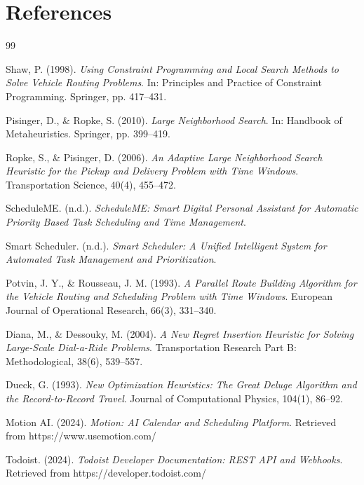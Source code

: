 \documentclass{article}
\begin{document}
\section*{References}

\begin{thebibliography}{99}

Shaw, P. (1998).
\textit{Using Constraint Programming and Local Search Methods to Solve Vehicle Routing Problems}.
In: Principles and Practice of Constraint Programming. Springer, pp. 417--431.

Pisinger, D., \& Ropke, S. (2010).
\textit{Large Neighborhood Search}.
In: Handbook of Metaheuristics. Springer, pp. 399--419.

Ropke, S., \& Pisinger, D. (2006).
\textit{An Adaptive Large Neighborhood Search Heuristic for the Pickup and Delivery Problem with Time Windows}.
Transportation Science, 40(4), 455--472.

ScheduleME. (n.d.).
\textit{ScheduleME: Smart Digital Personal Assistant for Automatic Priority Based Task Scheduling and Time Management}.

Smart Scheduler. (n.d.).
\textit{Smart Scheduler: A Unified Intelligent System for Automated Task Management and Prioritization}.

Potvin, J. Y., \& Rousseau, J. M. (1993).
\textit{A Parallel Route Building Algorithm for the Vehicle Routing and Scheduling Problem with Time Windows}.
European Journal of Operational Research, 66(3), 331--340.

Diana, M., \& Dessouky, M. (2004).
\textit{A New Regret Insertion Heuristic for Solving Large-Scale Dial-a-Ride Problems}.
Transportation Research Part B: Methodological, 38(6), 539--557.

Dueck, G. (1993).
\textit{New Optimization Heuristics: The Great Deluge Algorithm and the Record-to-Record Travel}.
Journal of Computational Physics, 104(1), 86--92.

Motion AI. (2024).
\textit{Motion: AI Calendar and Scheduling Platform}.
Retrieved from https://www.usemotion.com/

Todoist. (2024).
\textit{Todoist Developer Documentation: REST API and Webhooks}.
Retrieved from https://developer.todoist.com/

\end{thebibliography}
\end{document}
